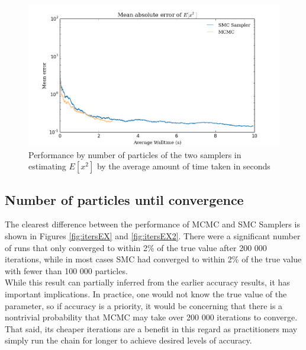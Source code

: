 \documentclass[12pt]{elsarticle}
\begin{document}
\begin{figure}[htbp]
\begin{center}
\includegraphics[width = \textwidth]{plots/E_X2_walltime.png}
\caption{Performance by number of particles of the two samplers in estimating $E[x^2]$ by the average amount of time taken in seconds}
\label{ex2}
\end{center}
\end{figure}

\subsection*{Number of particles until convergence }

The clearest difference between the performance of MCMC and SMC Samplers is shown in Figures \ref{fig:itersEX} and \ref{fig:itersEX2}. There were a significant number of runs that only converged to within 2\% of the true value after 200 000 iterations, while in most cases SMC had converged to within 2\% of the true value with fewer than 100 000 particles. \\ 

While this result can partially inferred from the earlier accuracy results, it has important implications. In practice, one would not know the true value of the parameter, so if accuracy is a priority, it would be concerning that there is a nontrivial probability that MCMC may take over 200 000 iterations to converge.  That said, its cheaper iterations are a benefit in this regard as practitioners may simply run the chain for longer to achieve desired levels of accuracy.
\end{document}
